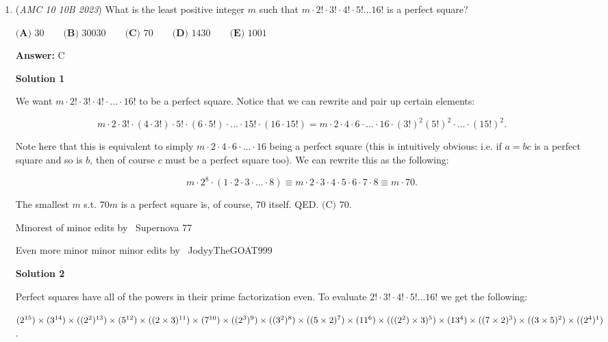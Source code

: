 \begin{enumerate}
 As $ab\in\{-1,1\}$, we have either $d^2=1$ or $d^2=3$.The latter is impossible, so
 \[d=1,\qquad ab=-1.\]

 Hence the only nonzero solutions are
 \[(m,n)=(1,-1),\ (-1,1).\]

 Including $(0,0)$, there are exactly
 \[\boxed{3}\]ordered pairs.

 


	\item (\textit{AMC 10 10B 2023}) What is the least positive integer $m$ such that $m \cdot 2! \cdot 3!\cdot 4!\cdot 5! \dots 16!$ is a perfect square?


 $\textbf{(A) }30\qquad\textbf{(B) }30030\qquad\textbf{(C) }70\qquad\textbf{(D) }1430\qquad\textbf{(E) }1001$

 \textbf{Answer: }C



\textbf{Solution 1}

We want $m\cdot2!\cdot3!\cdot4!\cdot\dots\cdot16!$ to be a perfect square. Notice that we can rewrite and pair up certain elements: 

 
 \[m\cdot2\cdot3!\cdot(4\cdot3!)\cdot5!\cdot(6\cdot5!)\cdot\dots\cdot15!\cdot(16\cdot15!)=m\cdot2\cdot4\cdot6\cdot\dots\cdot16\cdot(3!)^2(5!)^2\cdot\dots\cdot(15!)^2.\]

 Note here that this is equivalent to simply $m\cdot2\cdot4\cdot6\cdot\dots\cdot16$ being a perfect square (this is intuitively obvious: i.e. if $a=bc$ is a perfect square and so is $b$, then of course $c$ must be a perfect square too). We can rewrite this as the following: 

 
 \[m\cdot2^8\cdot(1\cdot2\cdot3\cdot\dots\cdot8)\equiv m\cdot2\cdot3\cdot4\cdot5\cdot6\cdot7\cdot8\equiv m\cdot70.\]

 The smallest $m$ s.t. $70m$ is a perfect square is, of course, $70$ itself. QED. $\boxed{\text{(C) }   70}$.

 Minorest of minor edits by ~Supernova 77

 Even more minor minor minor edits by ~JodyyTheGOAT999

 



\textbf{Solution 2}

Perfect squares have all of the powers in their prime factorization even. To evaluate $2!\cdot3!\cdot4!\cdot5!...16!$ we get the following:

 $(2^{15}) \times (3^{14}) \times ((2^2)^{13}) \times (5^{12}) \times ((2 \times 3)^{11}) \times (7^{10}) \times ((2^3)^{9}) \times ((3^2)^8) \times \\ ((5 \times 2)^7) \times (11^6) \times (((2^2) \times 3)^5) \times (13^4) \times ((7 \times 2)^3) \times ((3 \times 5)^2) \times ((2^4)^1)$.


\end{enumerate}
